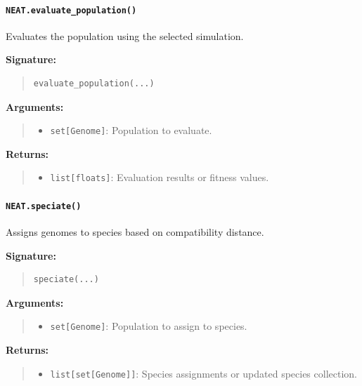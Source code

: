 \documentclass[11pt]{article}
\begin{document}
\paragraph{\texttt{NEAT.evaluate\_population()}}

Evaluates the population using the selected simulation.

\textbf{Signature:}
\begin{quote}
\begin{verbatim}
evaluate_population(...)
\end{verbatim}
\end{quote}

\textbf{Arguments:}
\begin{quote}
\begin{itemize}
    \item \texttt{set[Genome]}: Population to evaluate.
\end{itemize}
\end{quote}

\textbf{Returns:}
\begin{quote}
\begin{itemize}
    \item \texttt{list[floats]}: Evaluation results or fitness values.
\end{itemize}
\end{quote}

\paragraph{\texttt{NEAT.speciate()}}

Assigns genomes to species based on compatibility distance.

\textbf{Signature:}
\begin{quote}
\begin{verbatim}
speciate(...)
\end{verbatim}
\end{quote}

\textbf{Arguments:}
\begin{quote}
\begin{itemize}
    \item \texttt{set[Genome]}: Population to assign to species.
\end{itemize}
\end{quote}

\textbf{Returns:}
\begin{quote}
\begin{itemize}
    \item \texttt{list[set[Genome]]}: Species assignments or updated species collection.
\end{itemize}
\end{quote}
\end{document}
